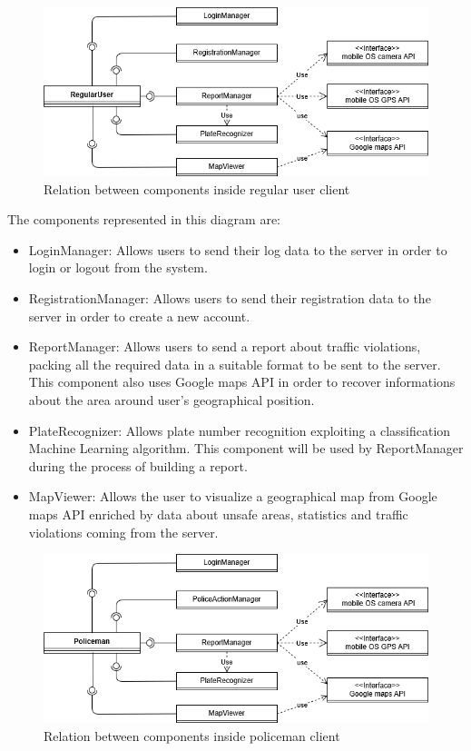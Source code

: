 \begin{figure}[h!]
	\centering
	\includegraphics[scale=0.7]{Images/RegularUserClient}
	\caption{Relation between components inside regular user client}
\end{figure}
The components represented in this diagram are:
\begin{itemize}
	\item LoginManager: Allows users to send their log data to the server in order to login or logout from the system.
	\item RegistrationManager: Allows users to send  their registration data to the server in order to create a new account.
	\item ReportManager: Allows users to send a report about traffic violations, packing all the required data in a suitable format to be sent to the server. This component also uses Google maps API in order to recover informations about the area around user's geographical position.
	\item PlateRecognizer: Allows plate number recognition exploiting a classification Machine Learning algorithm. This component will be used by ReportManager during the process of building a report.
	\item MapViewer: Allows the user to visualize a geographical map from Google maps API enriched by data about unsafe areas, statistics and traffic violations coming from the server.
\end{itemize}

\begin{figure}[h!]
	\centering
	\includegraphics[scale=0.7]{Images/PolicemanClient}
	\caption{Relation between components inside policeman client}
\end{figure}

